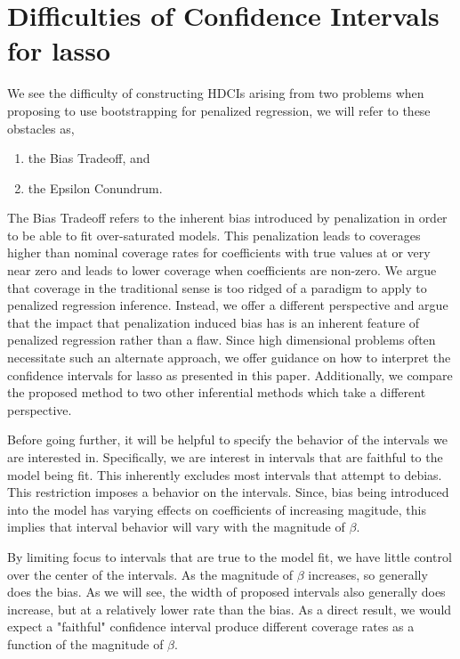 \section{Difficulties of Confidence Intervals for lasso}

We see the difficulty of constructing HDCIs arising from two problems when proposing to use bootstrapping for penalized regression, we will refer to these obstacles as,

\begin{enumerate}
\item the Bias Tradeoff, and
\item the Epsilon Conundrum.
\end{enumerate}

The Bias Tradeoff refers to the inherent bias introduced by penalization in order to be able to fit over-saturated models. This penalization leads to coverages higher than nominal coverage rates for coefficients with true values at or very near zero and leads to lower coverage when coefficients are non-zero. We argue that coverage in the traditional sense is too ridged of a paradigm to apply to penalized regression inference. Instead, we offer a different perspective and argue that the impact that penalization induced bias has is an inherent feature of penalized regression rather than a flaw. Since high dimensional problems often necessitate such an alternate approach, we offer guidance on how to interpret the confidence intervals for lasso as presented in this paper. Additionally, we compare the proposed method to two other inferential methods which take a different perspective.

Before going further, it will be helpful to specify the behavior of the intervals we are interested in. Specifically, we are interest in intervals that are faithful to the model being fit. This inherently excludes most intervals that attempt to debias. This restriction imposes a behavior on the intervals. Since, bias being introduced into the model has varying effects on coefficients of increasing magitude, this implies that interval behavior will vary with the magnitude of $\beta$.

By limiting focus to intervals that are true to the model fit, we have little control over the center of the intervals. As the magnitude of $\beta$ increases, so generally does the bias. As we will see, the width of proposed intervals also generally does increase, but at a relatively lower rate than the bias. As a direct result, we would expect a "faithful" confidence interval produce different coverage rates as a function of the magnitude of $\beta$.

